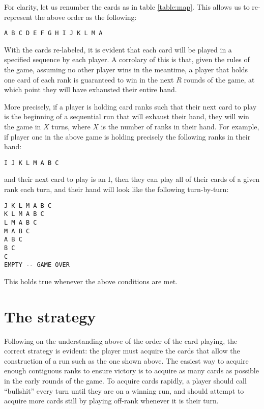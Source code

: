\documentclass[12pt]{article}
\begin{document}
For clarity, let us renumber the cards as in table \ref{table:map}. This allows
us to re-represent the above order as the following:

\begin{lstlisting}
A B C D E F G H I J K L M A
\end{lstlisting}

With the cards re-labeled, it is evident that each card will be played in a
specified sequence by each player. A corrolary of this is that, given the rules
of the game, assuming no other player wins in the meantime, a player that holds
one card of each rank is guaranteed to win in the next $R$ rounds of the game,
at which point they will have exhausted their entire hand.

More precisely, if a player is holding card ranks such that their next card to
play is the beginning of a sequential run that will exhaust their hand, they
will win the game in $X$ turns, where $X$ is the number of ranks in their hand.
For example, if player one in the above game is holding precisely the following
ranks in their hand:

\begin{lstlisting}
I J K L M A B C
\end{lstlisting}

and their next card to play is an I, then they can play all of their cards of a
given rank each turn, and their hand will look like the following turn-by-turn:

\begin{lstlisting}
J K L M A B C
K L M A B C
L M A B C
M A B C
A B C
B C
C
EMPTY -- GAME OVER
\end{lstlisting}

This holds true whenever the above conditions are met.

\section{The strategy}

Following on the understanding above of the order of the card playing, the
correct strategy is evident: the player must acquire the cards that allow the
construction of a run such as the one shown above.  The easiest way to acquire
enough contiguous ranks to ensure victory is to acquire as many cards as
possible in the early rounds of the game. To acquire cards rapidly, a player
should call ``bullshit'' every turn until they are on a winning run, and should
attempt to acquire more cards still by playing off-rank whenever it is their
turn.
\end{document}
